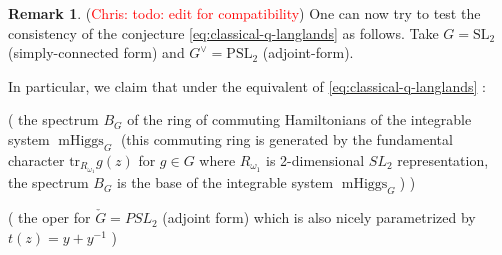 \documentclass[11pt, oneside, reqno]{amsart}
\theoremstyle{definition} \newtheorem{definition}{Definition}[section]
\theoremstyle{definition} \newtheorem{remark}[definition]{Remark}
\theoremstyle{definition} \newtheorem{remarks}[definition]{Remarks}
\theoremstyle{definition} \newtheorem{question}[definition]{Question}
\theoremstyle{definition} \newtheorem*{note}{Note}
\theoremstyle{definition} \newtheorem{example}[definition]{Example}
\theoremstyle{definition} \newtheorem{examples}[definition]{Examples}
\newcommand{\mr}[1]{\mathrm{#1}}
\newcommand{\SL}{\mathrm{SL}}
\DeclareMathOperator{\mhiggs}{mHiggs}
\newcommand{\chris}[1]{(\textcolor{red}{Chris: #1})}
\begin{document}
\begin{remark}
\chris{todo: edit for compatibility} One can now try to test the consistency
  of the conjecture \ref{eq:classical-q-langlands} as follows.
  Take $G = \SL_2$ (simply-connected form)
  and $G^\vee = \mr{PSL}_2$ (adjoint-form).

  In particular, we claim that under the equivalent of \ref{eq:classical-q-langlands} :

( the spectrum $B_{G}$  of the ring of commuting Hamiltonians
  of the integrable system $\mhiggs_{G}$ (this commuting ring
  is generated by the  fundamental character $\mathrm{tr}_{R_{\omega_1}} g(z)$ for $g \in G$  where $R_{\omega_1}$ is 2-dimensional $SL_2$ representation,
  the spectrum $B_{G}$ is the base of the integrable system $\mhiggs_{G}$) ) 
  

{  }

(  the oper for $\check G = PSL_2$  (adjoint form) which is also nicely
parametrized 
by $t(z) = y + y^{-1}$ ) 
\end{remark}
 


\end{document}
